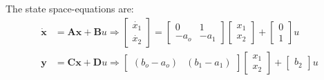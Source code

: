 \documentclass[paper=a4, fontsize=11pt]{scrartcl} %
\numberwithin{equation}{section} %
\numberwithin{figure}{section} %
\numberwithin{table}{section} %
\begin{document}
\begin{section}{}
The state space-equations are:\\

\begin{align}
\boldsymbol{\dot{x}}&=\boldsymbol{Ax}+\boldsymbol{B}u\Rightarrow \begin{bmatrix} \dot{x_1}\\ \dot{x_2} \end{bmatrix} =\begin{bmatrix}
0 & 1\\-a_o & -a_1
\end{bmatrix}\begin{bmatrix}
x_1\\x_2
\end{bmatrix}+ \begin{bmatrix}0\\1\end{bmatrix}u\\
\boldsymbol{y}&=\boldsymbol{Cx}+\boldsymbol{D}u \Rightarrow \begin{bmatrix}
(b_o-a_o) & (b_1-a_1)\end{bmatrix} \begin{bmatrix}
x_1 \\ x_2
\end{bmatrix}+\begin{bmatrix}
b_2
\end{bmatrix}u
\end{align}
 
\end{section}
\end{document}
